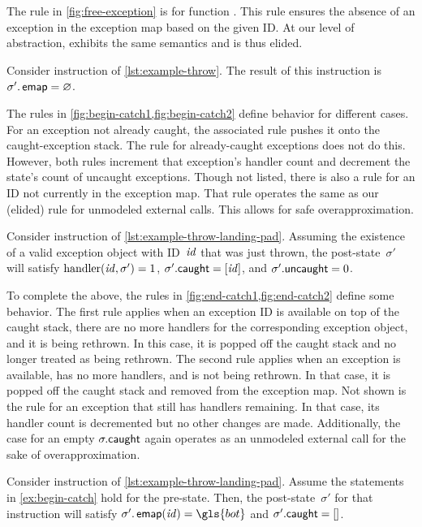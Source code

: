 The rule in \cref{fig:free-exception} is for function .
This rule ensures the absence of an exception in the exception map based on the given ID.
At our level of abstraction,  exhibits the same semantics and is thus elided.
\begin{example}
  Consider instruction  of \cref{lst:example-throw}.
  The result of this instruction is $\sigma'.\operatorname{\mathsf{emap}}=\varnothing$.
\end{example}

The rules in \cref{fig:begin-catch1,fig:begin-catch2} define  behavior for different cases.
For an exception not already caught, the associated rule pushes it onto the caught-exception stack.
The rule for already-caught exceptions does not do this.
However, both rules increment that exception's handler count and decrement the state's count of uncaught exceptions.
Though not listed, there is also a rule for an ID not currently in the exception map.
That rule operates the same as our (elided) rule for unmodeled external calls.
This allows for safe overapproximation.
\begin{example}\label{ex:begin-catch}
  Consider instruction  of \cref{lst:example-throw-landing-pad}.
  Assuming the existence of a valid exception object with ID~$\mathit{id}$ that was just thrown, the post-state~$\sigma'$ will satisfy $\operatorname{handler}(\mathit{id},\sigma')=1$, $\sigma'.\mathsf{caught}=[\mathit{id}]$, and $\sigma'.\mathsf{uncaught}=0$.
\end{example}

To complete the above, the rules in \cref{fig:end-catch1,fig:end-catch2} define some  behavior.
The first rule applies when an exception ID is available on top of the caught stack, there are no more handlers for the corresponding exception object,
and it is being rethrown.
In this case, it is popped off the caught stack and no longer treated as being rethrown.
The second rule applies when an exception is available, has no more handlers, and is not being rethrown. In that case, it is popped off the caught stack and removed from the exception map.
Not shown is the rule for an exception that still has handlers remaining.
In that case, its handler count is decremented but no other changes are made.
Additionally, the case for an empty $\sigma.\mathsf{caught}$ again operates as an unmodeled external call for the sake of overapproximation.
\begin{example}
  Consider instruction  of \cref{lst:example-throw-landing-pad}.
  Assume the statements in \cref{ex:begin-catch} hold for the pre-state.
  Then, the post-state~$\sigma'$ for that instruction will satisfy $\sigma'.\emap(\id)=\gls{bot}$ and $\sigma'.\mathsf{caught}=[]$.
\end{example}

